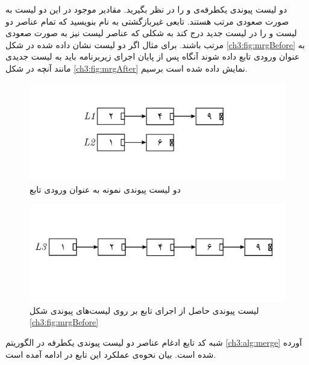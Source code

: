 دو لیست پیوندی یکطرفه‌ی {} و {} را در نظر بگیرید. مقادیر موجود در این دو لیست به صورت صعودی مرتب هستند. تابعی غیربازگشتی به نام {} بنویسید که تمام عناصر دو لیست {} و {} را در لیست جدید {} درج کند به شکلی که عناصر لیست {} نیز به صورت صعودی مرتب باشند. برای مثال اگر دو لیست نشان داده شده در شکل {\eqref{ch3:fig:mrgBefore}} به عنوان ورودی تابع {} داده شوند آنگاه پس از پایان اجرای زیربرنامه باید به لیست جدیدی مانند آنچه در شکل {\eqref{ch3:fig:mrgAfter}} نمایش داده شده است برسیم.

\begin{figure}
\begin{center}
\includegraphics[scale=0.33]{figs/ch3/merge_input_lists.pdf}
\caption{دو لیست پیوندی نمونه به عنوان ورودی تابع {}}\label{ch3:fig:mrgBefore}
\end{center}
\end{figure}

\begin{figure}
\begin{center}
\includegraphics[scale=0.33]{figs/ch3/merge_output_list.pdf}
\caption{%
لیست پیوندی حاصل از اجرای تابع {} بر روی لیست‌های پیوندی شکل {\eqref{ch3:fig:mrgBefore}}
}
\label{ch3:fig:mrgAfter}
\end{center}
\end{figure}


شبه کد تابع ادغام عناصر دو لیست پیوندی یکطرفه در الگوریتم {\eqref{ch3:alg:merge}} آورده شده است. بیان نحوه‌ی عملکرد این تابع در ادامه آمده است. 


